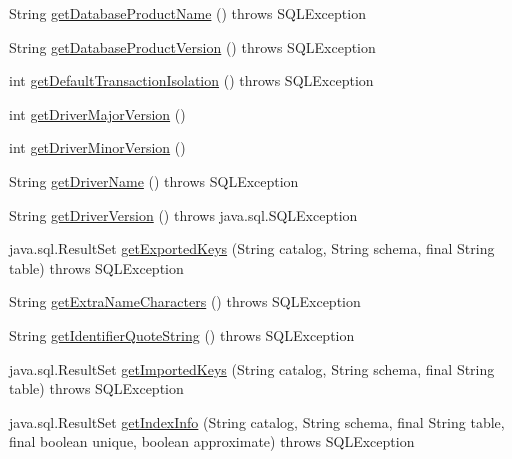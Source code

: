 \begin{DoxyCompactItemize}
\item 
String \mbox{\hyperlink{classcom_1_1mysql_1_1jdbc_1_1_database_meta_data_ae20af1bd814a8658c5ab5c8fab239c0f}{get\+Database\+Product\+Name}} ()  throws S\+Q\+L\+Exception 
\item 
String \mbox{\hyperlink{classcom_1_1mysql_1_1jdbc_1_1_database_meta_data_a7b81e97e134818164e79077b98836631}{get\+Database\+Product\+Version}} ()  throws S\+Q\+L\+Exception 
\item 
int \mbox{\hyperlink{classcom_1_1mysql_1_1jdbc_1_1_database_meta_data_ac945602242f39a14278fa4951d98eb64}{get\+Default\+Transaction\+Isolation}} ()  throws S\+Q\+L\+Exception 
\item 
int \mbox{\hyperlink{classcom_1_1mysql_1_1jdbc_1_1_database_meta_data_a4acfb73ff8817fb89934e9a30795e5cc}{get\+Driver\+Major\+Version}} ()
\item 
int \mbox{\hyperlink{classcom_1_1mysql_1_1jdbc_1_1_database_meta_data_a319e967e9ecdd028ce8a068bbb1c7532}{get\+Driver\+Minor\+Version}} ()
\item 
String \mbox{\hyperlink{classcom_1_1mysql_1_1jdbc_1_1_database_meta_data_ad5f6016d58002924a8c9d065424c5942}{get\+Driver\+Name}} ()  throws S\+Q\+L\+Exception 
\item 
String \mbox{\hyperlink{classcom_1_1mysql_1_1jdbc_1_1_database_meta_data_ae5981a4937e8df7a5ff660c7e55cd939}{get\+Driver\+Version}} ()  throws java.\+sql.\+S\+Q\+L\+Exception 
\item 
java.\+sql.\+Result\+Set \mbox{\hyperlink{classcom_1_1mysql_1_1jdbc_1_1_database_meta_data_a17c160fdaac4749922b8ec683b4ab138}{get\+Exported\+Keys}} (String catalog, String schema, final String table)  throws S\+Q\+L\+Exception 
\item 
String \mbox{\hyperlink{classcom_1_1mysql_1_1jdbc_1_1_database_meta_data_a9502cc2c9909434a8f19ffdfd058ed2e}{get\+Extra\+Name\+Characters}} ()  throws S\+Q\+L\+Exception 
\item 
String \mbox{\hyperlink{classcom_1_1mysql_1_1jdbc_1_1_database_meta_data_a1a0f564a2d0f6c011143f31f9a0128ef}{get\+Identifier\+Quote\+String}} ()  throws S\+Q\+L\+Exception 
\item 
java.\+sql.\+Result\+Set \mbox{\hyperlink{classcom_1_1mysql_1_1jdbc_1_1_database_meta_data_a0161436eb7ad9574d25bd90730891e25}{get\+Imported\+Keys}} (String catalog, String schema, final String table)  throws S\+Q\+L\+Exception 
\item 
java.\+sql.\+Result\+Set \mbox{\hyperlink{classcom_1_1mysql_1_1jdbc_1_1_database_meta_data_a38ec4711078e1131351d9514721a8691}{get\+Index\+Info}} (String catalog, String schema, final String table, final boolean unique, boolean approximate)  throws S\+Q\+L\+Exception 

\end{DoxyCompactItemize}
